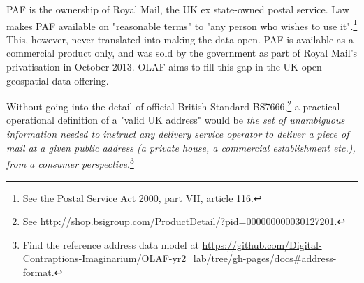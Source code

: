 PAF is the ownership of Royal Mail, the UK ex state-owned postal service. Law makes PAF available on "reasonable terms" to "any person who wishes to use it".\footnote{See the Postal Service Act 2000, part VII, article 116.} This, however, never translated into making the data open. PAF is available as a commercial product only, and was sold by the government as part of Royal Mail's privatisation in October 2013. OLAF aims to fill this gap in the UK open geospatial data offering. 

Without going into the detail of official British Standard BS7666,\footnote{See \url{http://shop.bsigroup.com/ProductDetail/?pid=000000000030127201}.} a practical operational definition of a "valid UK address" would be {\it the set of unambiguous information needed to instruct any delivery service operator to deliver a piece of mail at a given public address (a private house, a commercial establishment etc.), from a consumer perspective}.\footnote{Find the reference address data model at \url{https://github.com/Digital-Contraptions-Imaginarium/OLAF-yr2_lab/tree/gh-pages/docs#address-format}.} 
